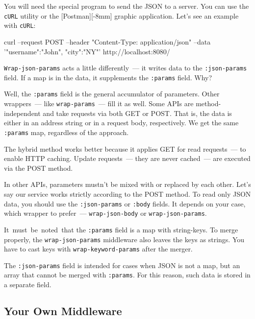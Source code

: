\fi


You will need the special program to send the JSON to a server. You can use the \verb|cURL| utility or the [Post\-man][-8mm] graphic application.  Let's see an example with \verb|cURL|:

\begin{bash}
curl --request POST
     --header "Content-Type:
                 application/json"
     --data '{"username":"John",
                      "city":"NY"}'
     http://localhost:8080/
\end{bash}

\verb|Wrap-json-params| acts a little differently~--- it writes data to the \verb|:json-params| field. If a map is in the data, it supplements the \verb|:params| field. Why?

Well, the \verb|:params| field is the general accumulator of parameters. Other wrappers~--- like \verb|wrap-params|~--- fill it as well. Some APIs are method-independent and take requests via both GET or POST. That is, the data is either in an address string or in a request body, respectively. We get the same \verb|:params| map, regardless of the approach.

The hybrid method works better because it applies GET for read requests~--- to enable HTTP caching.  Update requests~--- they are never cached~--- are executed
via the POST method.

In other APIs, parameters mustn't be mixed with or replaced by each other. Let's say our service works strictly according to the POST method. To read only JSON data, you should use the \verb|:json-params| or \verb|:body| fields. It depends on your case, which wrapper to prefer~--- \verb|wrap-json-body| or \verb|wrap-json-params|.


It must be noted that the \verb|:params| field is a map with string-keys. To merge properly, the \verb|wrap-json-params| middleware also leaves the keys as strings. You have to cast keys with \verb|wrap-keyword-params| after the merger.

The \verb|:json-params| field is intended for cases when JSON is not a map, but an array that cannot be merged with \verb|:params|. For this reason, such data is stored in a separate field.

\subsection{Your Own Middleware}


